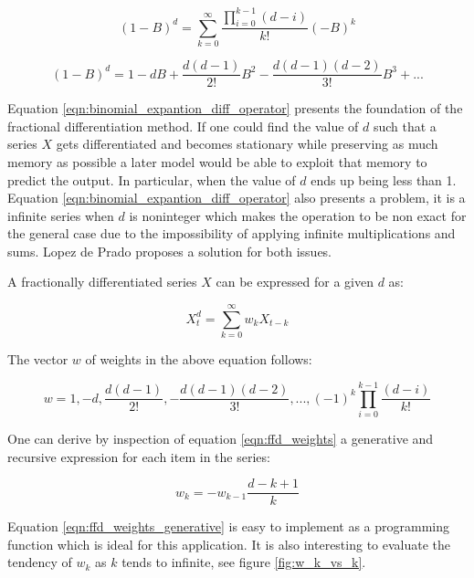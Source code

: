 \[(1-B)^d = \sum_{k=0}^{\infty} \frac{\prod_{i=0}^{k-1}(d-i)}{k!} (-B)^k \]

\begin{equation}
  \label{eqn:binomial_expantion_diff_operator}
  (1-B)^d = 1 - dB + \frac{d(d-1)}{2!}B^2 - \frac{d(d-1)(d-2)}{3!}B^3 + ...
\end{equation}

Equation \ref{eqn:binomial_expantion_diff_operator} presents the foundation of
the fractional differentiation method. If one could find the value of $d$ such
that a series $X$ gets differentiated and becomes stationary while preserving
as much memory as possible a later model would be able to exploit that memory to
predict the output. In particular, when the value of $d$ ends up being less than 1.
Equation \ref{eqn:binomial_expantion_diff_operator} also
presents a problem, it is a infinite series when $d$ is noninteger which makes
the operation to be non exact for the general case due to the impossibility of
applying infinite multiplications and sums. Lopez de Prado proposes a solution
for both issues.

A fractionally differentiated series $X$ can be expressed for a given $d$ as: 

\[ X_t^d = \sum_{k=0}^{\infty} w_k X_{t-k} \]

The vector $w$ of weights in the above equation follows:

\begin{equation}
  \label{eqn:ffd_weights}
	w = {1, -d, \frac{d(d-1)}{2!}, -\frac{d(d-1)(d-2)}{3!}, ..., (-1)^k \prod_{i=0}^{k-1} \frac{(d-i)}{k!}} 
\end{equation}

One can derive by inspection of equation \ref{eqn:ffd_weights} a generative and
recursive expression for each item in the series:

\begin{equation}
  \label{eqn:ffd_weights_generative}
  w_k = -w_{k-1} \frac{d-k+1}{k}
\end{equation}

Equation \ref{eqn:ffd_weights_generative} is easy to implement as a programming
function which is ideal for this application. It is also interesting to evaluate
the tendency of $w_k$ as $k$ tends to infinite, see figure \ref{fig:w_k_vs_k}.

